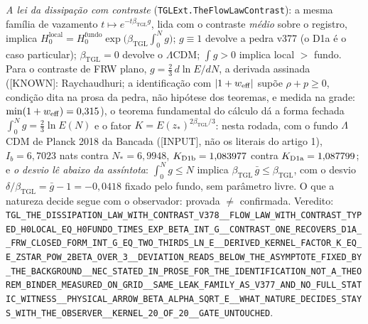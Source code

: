 \documentclass[11pt]{article}
\newcommand{\bTGL}{\beta_{\mathrm{TGL}}}\newcommand{\Msun}{M_{\odot}}\newcommand{\TGL}{\mathrm{TGL}}
\theoremstyle{definition}\newtheorem{deriv}{Derivação}
\begin{document}
\emph{A lei da dissipação com contraste} (\texttt{TGLExt.TheFlowLawContrast}): a mesma família de vazamento $t\mapsto e^{-t\bTGL g}$, lida com o contraste \emph{médio} sobre o registro, implica $H_0^{\mathrm{local}}=H_0^{\mathrm{fundo}}\exp\!\big(\bTGL\int_0^{N}g\big)$; $g\equiv1$ devolve a pedra v377 (o D1a é o caso particular); $\bTGL=0$ devolve o $\Lambda$CDM; $\int g>0$ implica local $>$ fundo. Para o contraste de FRW plano, $g=\tfrac23\,d\ln E/dN$, a derivada assinada (\textsf{[KNOWN]}: Raychaudhuri; a identificação com $|1+w_{\rm eff}|$ supõe $\rho+p\ge0$, condição dita na prosa da pedra, não hipótese dos teoremas, e medida na grade: $\min(1+w_{\rm eff})=0{,}315$), o teorema fundamental do cálculo dá a forma fechada $\int_0^{N}g=\tfrac23\ln E(N)$ e o fator \textbf{$K=E(z_*)^{2\bTGL/3}$}: nesta rodada, com o fundo $\Lambda$CDM de Planck 2018 da Bancada (\textsf{[INPUT]}, não os literais do artigo 1), $I_b=6{,}7023$ nats contra $N_*=6{,}9948$, $K_{\rm D1b}=1{,}083977$ contra $K_{\rm D1a}=1{,}087799$; e \emph{o desvio lê abaixo da assíntota}: $\int_0^{N}g\le N$ implica $\bTGL\,\bar g\le\bTGL$, com o desvio $\delta/\bTGL=\bar g-1=-0{,}0418$ fixado pelo fundo, sem parâmetro livre. O que a natureza decide segue com o observador: provada $\neq$ confirmada. Veredito: \texttt{TGL\_THE\_DISSIPATION\_LAW\_WITH\_CONTRAST\_V378\_\_FLOW\_LAW\_WITH\_CONTRAST\_TYPED\_H0LOCAL\_EQ\_H0FUNDO\_TIMES\_EXP\_BETA\_INT\_G\_\_CONTRAST\_ONE\_RECOVERS\_D1A\_\_FRW\_CLOSED\_FORM\_INT\_G\_EQ\_TWO\_THIRDS\_LN\_E\_\_DERIVED\_KERNEL\_FACTOR\_K\_EQ\_E\_ZSTAR\_POW\_2BETA\_OVER\_3\_\_DEVIATION\_READS\_BELOW\_THE\_ASYMPTOTE\_FIXED\_BY\_THE\_BACKGROUND\_\_NEC\_STATED\_IN\_PROSE\_FOR\_THE\_IDENTIFICATION\_NOT\_A\_THEOREM\_BINDER\_MEASURED\_ON\_GRID\_\_SAME\_LEAK\_FAMILY\_AS\_V377\_AND\_NO\_FULL\_STATIC\_WITNESS\_\_PHYSICAL\_ARROW\_BETA\_ALPHA\_SQRT\_E\_\_WHAT\_NATURE\_DECIDES\_STAYS\_WITH\_THE\_OBSERVER\_\_KERNEL\_20\_OF\_20\_\_GATE\_UNTOUCHED}.
\end{document}
